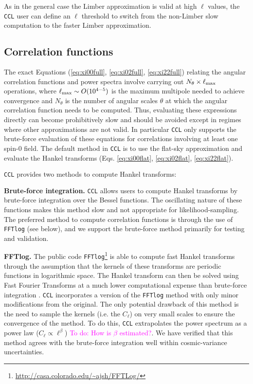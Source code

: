 \documentclass[\docopts]{\docclass}
\newcommand{\todo}[1]{\textcolor{magenta}{To do: #1}}
\newcommand{\ccl}{{\tt CCL}\xspace}
\begin{document}
As in the general case the Limber approximation is valid at high $\ell$ values, the \ccl user can define an $\ell$ threshold to switch from the non-Limber slow computation to the faster Limber approximation.
 


\subsection{Correlation functions}

The exact Equations (\ref{eq:xi00full}, \ref{eq:xi02full}, \ref{eq:xi22full}) relating the angular correlation functions and power spectra involve carrying out $N_\theta\times\ell_{\rm max}$ operations, where $\ell_{\rm max}\sim O(10^{4-5})$ is the maximum multipole needed to achieve convergence and $N_\theta$ is the number of angular scales $\theta$ at which the angular correlation function needs to be computed. Thus, evaluating these expressions directly can become prohibitively slow and should be avoided except in regimes where other approximations are not valid. In particular \ccl only supports the brute-force evaluation of these equations for correlations involving at least one spin-0 field. The default method in \ccl is to use the flat-sky approximation and evaluate the Hankel transforms (Eqs. \ref{eq:xi00flat}, \ref{eq:xi02flat}, \ref{eq:xi22flat}).

\ccl provides two methods to compute Hankel transforms:

{\bf Brute-force integration.} \ccl allows users to compute Hankel transforms by brute-force integration over the Bessel functions. The oscillating nature of these functions makes this method slow and not appropriate for likelihood-sampling. The preferred method to compute correlation functions is through the use of {\tt FFTlog} (see below), and we support the brute-force method primarily for testing and validation.

{\bf FFTlog.} The public code {\tt FFTlog}\footnote{\url{http://casa.colorado.edu/~ajsh/FFTLog/}} is able to compute fast Hankel transforms through the assumption that the kernels of these transforms are periodic functions in logarithmic space. The Hankel transform can then be solved using Fast Fourier Transforms at a much lower computational expense than brute-force integration \citep{Hamilton2000,Talman2009}. \ccl incorporates a version of the {\tt FFTlog} method with only minor modifications from the original. The only potential drawback of this method is the need to sample the kernels (i.e. the $C_\ell$) on very small scales to ensure the convergence of the method. To do this, \ccl extrapolates the power spectrum as a power law ($C_\ell\propto\ell^\beta$) \todo{How is $\beta$ estimated?}. We have verified that this method agrees with the brute-force integration  well within cosmic-variance uncertainties.
\end{document}
